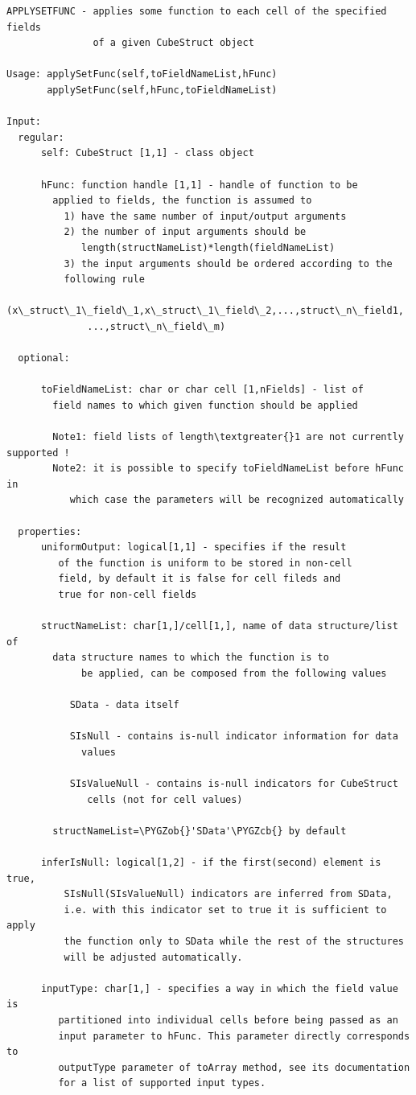\documentclass[letterpaper,10pt,english]{sphinxmanual}
\def\PYGZob{\char`\{}
\def\PYGZcb{\char`\}}
\begin{document}
\begin{Verbatim}[commandchars=\\\{\}]
APPLYSETFUNC - applies some function to each cell of the specified fields
               of a given CubeStruct object

Usage: applySetFunc(self,toFieldNameList,hFunc)
       applySetFunc(self,hFunc,toFieldNameList)

Input:
  regular:
      self: CubeStruct [1,1] - class object

      hFunc: function handle [1,1] - handle of function to be
        applied to fields, the function is assumed to
          1) have the same number of input/output arguments
          2) the number of input arguments should be
             length(structNameList)*length(fieldNameList)
          3) the input arguments should be ordered according to the
          following rule
              (x\_struct\_1\_field\_1,x\_struct\_1\_field\_2,...,struct\_n\_field1,
              ...,struct\_n\_field\_m)

  optional:

      toFieldNameList: char or char cell [1,nFields] - list of
        field names to which given function should be applied

        Note1: field lists of length\textgreater{}1 are not currently supported !
        Note2: it is possible to specify toFieldNameList before hFunc in
           which case the parameters will be recognized automatically

  properties:
      uniformOutput: logical[1,1] - specifies if the result
         of the function is uniform to be stored in non-cell
         field, by default it is false for cell fileds and
         true for non-cell fields

      structNameList: char[1,]/cell[1,], name of data structure/list of
        data structure names to which the function is to
             be applied, can be composed from the following values

           SData - data itself

           SIsNull - contains is-null indicator information for data
             values

           SIsValueNull - contains is-null indicators for CubeStruct
              cells (not for cell values)

        structNameList=\PYGZob{}'SData'\PYGZcb{} by default

      inferIsNull: logical[1,2] - if the first(second) element is true,
          SIsNull(SIsValueNull) indicators are inferred from SData,
          i.e. with this indicator set to true it is sufficient to apply
          the function only to SData while the rest of the structures
          will be adjusted automatically.

      inputType: char[1,] - specifies a way in which the field value is
         partitioned into individual cells before being passed as an
         input parameter to hFunc. This parameter directly corresponds to
         outputType parameter of toArray method, see its documentation
         for a list of supported input types.
\end{Verbatim}
\end{document}
